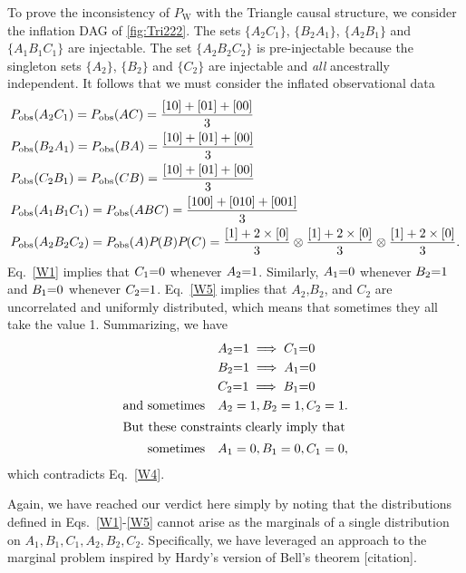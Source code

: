 To prove the inconsistency of  $P_{\text{W}}$ with the Triangle causal structure, we consider the inflation DAG of \cref{fig:Tri222}. 
The sets $\{A_2 C_1\}$, $\{B_2 A_1\}$, $\{A_2 B_1\}$ and $\{ A_1 B_1 C_1\}$ are injectable.  The set $\{ A_2 B_2 C_2\}$ is pre-injectable because the singleton sets $\{A_2\}$,  $\{B_2\}$ and $\{C_2\}$ are injectable and \emph{all} ancestrally independent. It follows that we must consider the inflated observational data
\begin{align}
&\pdf[\text{obs}]{A_2 C_1}=\pdf[\text{obs}]{A C} = \frac{[10]+[01]+[00]}{3} \label{W1}\\
&\pdf[\text{obs}]{B_2 A_1}=\pdf[\text{obs}]{B A} = \frac{[10]+[01]+[00]}{3} \label{W2}\\
&\pdf[\text{obs}]{C_2 B_1}=\pdf[\text{obs}]{C B} = \frac{[10]+[01]+[00]}{3} \label{W3}\\
&\pdf[\text{obs}]{A_1 B_1 C_1}=\pdf[\text{obs}]{A B C}  = \frac{[100]+[010]+[001]}{3} \label{W4}\\
&\pdf[\text{obs}]{A_2 B_2 C_2}=\pdf[\text{obs}]{A}\pdf{B}\pdf{C} = \frac{[1]+2\times[0]}{3}\otimes\frac{[1]+2\times[0]}{3}\otimes\frac{[1]+2\times[0]}{3} \label{W5}.
\end{align}
Eq.~\eqref{W1} %
implies that $C_1\eql 0$ whenever $A_2 \eql 1$. Similarly, $A_1\eql 0$ whenever $B_2\eql 1$ and $B_1\eql 0$ whenever $C_2\eql 1$. Eq.~\eqref{W5} %
implies that $A_2$,$B_2$, and $C_2$ are uncorrelated and uniformly distributed, which means that sometimes they all take the value 1. 
Summarizing, we have
\begin{align*} 
&A_2 \eql 1 \implies C_1\eql 0\\
&B_2\eql 1 \implies A_1\eql 0\\
&C_2 \eql 1 \implies B_1 \eql 0\\
\text{and sometimes}
 \quad &A_2=1, B_2=1, C_2=1.
\\
\shortintertext{But these constraints clearly imply that}
\text{sometimes} \quad &A_1=0, B_1=0, C_1=0,
\end{align*}
which contradicts Eq.~\eqref{W4}.%

Again, we have reached our verdict here simply by noting that the distributions defined in Eqs.~\eqref{W1}-\eqref{W5} cannot arise as the marginals of a single distribution on $A_1, B_1, C_1, A_2, B_2, C_2$.  Specifically, we have leveraged an approach to the marginal problem inspired by Hardy's version of Bell's theorem [citation].


